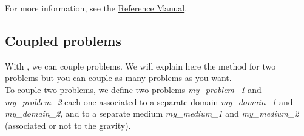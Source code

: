 For more information, see the \href{\REFERENCEMANUAL\#pbconduction}{\trustref Reference Manual}.

\subsection{Coupled problems}
With \trust, we can couple problems. We will explain here the method for two problems
but you can couple as many problems as you want.\\

To couple two problems, we define two problems \textit{my\_problem\_1} and \textit{my\_problem\_2} each one associated to a separate domain \textit{my\_domain\_1} and \textit{my\_domain\_2}, and to a separate medium \textit{my\_medium\_1} and \textit{my\_medium\_2} (associated or not to the gravity).
\begin{center}
\end{center}


